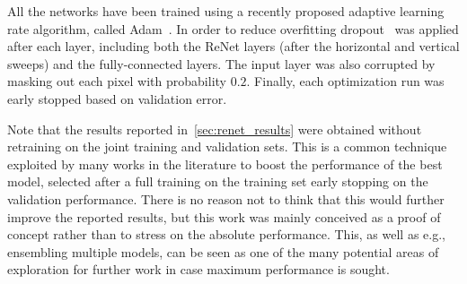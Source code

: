 All the networks have been trained using a recently proposed adaptive learning
rate algorithm, called Adam~\citep{Kingma2014}. In order to reduce overfitting
dropout~\citep{Srivastava14} was applied after each layer, including both the
ReNet layers (after the horizontal and vertical sweeps) and the fully-connected
layers. The input layer was also corrupted by masking out each pixel with
probability $0.2$. Finally, each optimization run was early stopped based
on validation error.

Note that the results reported in~\autoref{sec:renet_results} were obtained
without retraining on the joint training and validation sets. This is a common
technique exploited by many works in the literature to boost the performance
of the best model, selected after a full training on the training set early
stopping on the validation performance. There is no reason not to think that
this would further improve the reported results, but this work was mainly
conceived as a proof of concept rather than to stress on the absolute
performance. This, as well as e.g., ensembling multiple models, can be seen as
one of the many potential areas of exploration for further work in case maximum
performance is sought.

